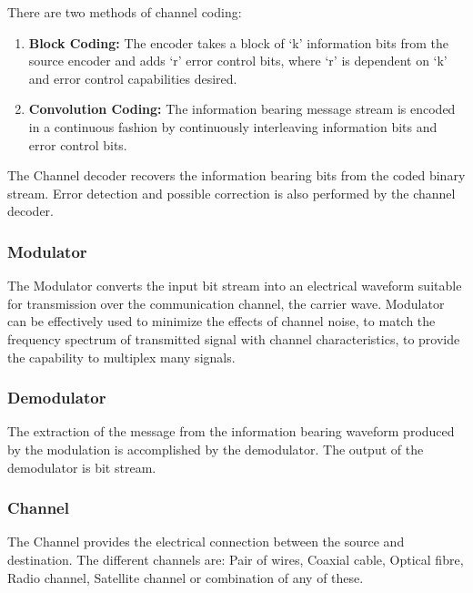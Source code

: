 There are two methods of channel coding:

\begin{enumerate}

  \item \textbf{Block Coding:} The encoder takes a block of ‘k’ information bits
  from the source encoder and adds ‘r’ error control bits, where ‘r’ is dependent
  on ‘k’ and error control capabilities desired.

  \item \textbf{Convolution Coding:} The information bearing message stream is
  encoded in a continuous fashion by continuously interleaving information bits
  and error control bits.

\end{enumerate}


The Channel decoder recovers the information bearing bits from the coded binary
stream. Error detection and possible correction is also performed by the channel
decoder.

\subsubsection{Modulator}

The Modulator converts the input bit stream into an electrical waveform suitable
for transmission over the communication channel, the carrier wave. Modulator can
be effectively used to minimize the effects of channel noise, to match the
frequency spectrum of transmitted signal with channel characteristics, to
provide the capability to multiplex many signals.

\subsubsection{Demodulator}

The extraction of the message from the information bearing waveform produced by
the modulation is accomplished by the demodulator. The output of the demodulator
is bit stream.

\subsubsection{Channel}

The Channel provides the electrical connection between the source and
destination. The different channels are: Pair of wires, Coaxial cable, Optical
fibre, Radio channel, Satellite channel or combination of any of these.\\

